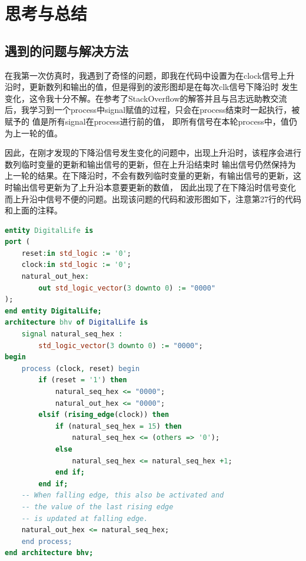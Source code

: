 \documentclass[UTF8]{article}
\begin{document}
\section{思考与总结}
\subsection{遇到的问题与解决方法}

\qquad 在我第一次仿真时，我遇到了奇怪的问题，即我在代码中设置为在clock信号上升沿时，更新数列和输出的值，但是得到的波形图却是在每次clk信号下降沿时
发生变化，这令我十分不解。在参考了StackOverflow的解答并且与吕志远助教交流后，我学习到一个process中signal赋值的过程，只会在process结束时一起执行，被赋予的
值是所有signal在process进行前的值，
即所有信号在本轮process中，值仍为上一轮的值。

\qquad 因此，在刚才发现的下降沿信号发生变化的问题中，出现上升沿时，该程序会进行数列临时变量的更新和输出信号的更新，但在上升沿结束时
输出信号仍然保持为上一轮的结果。在下降沿时，不会有数列临时变量的更新，有输出信号的更新，这时输出信号更新为了上升沿本意要更新的数值，
因此出现了在下降沿时信号变化而上升沿中信号不便的问题。出现该问题的代码和波形图如下，注意第27行的代码和上面的注释。

\begin{lstlisting}[language={vhdl}]
entity DigitalLife is
port (
    reset:in std_logic := '0';  
    clock:in std_logic := '0';  
    natural_out_hex: 
        out std_logic_vector(3 downto 0) := "0000"
);
end entity DigitalLife;
architecture bhv of DigitalLife is
    signal natural_seq_hex :
        std_logic_vector(3 downto 0) := "0000";
begin
    process (clock, reset) begin
        if (reset = '1') then
            natural_seq_hex <= "0000";
            natural_out_hex <= "0000";
        elsif (rising_edge(clock)) then
            if (natural_seq_hex = 15) then
                natural_seq_hex <= (others => '0'); 
            else
                natural_seq_hex <= natural_seq_hex +1;
            end if;
        end if;
    -- When falling edge, this also be activated and
    -- the value of the last rising edge
    -- is updated at falling edge.
    natural_out_hex <= natural_seq_hex;
    end process;
end architecture bhv;

\end{lstlisting}
\end{document}
